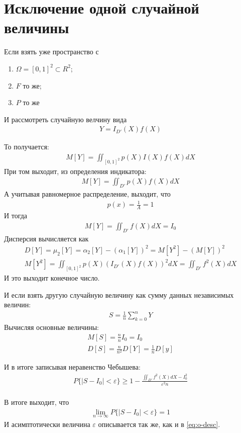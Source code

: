 \section{Исключение одной случайной величины}
Если взять уже пространство с
\begin{enumerate}
	\item \(\Omega = [0,1]^2 \subset R^2\);
	\item \(F\) то же;
	\item \(P\) то же
\end{enumerate}

И рассмотреть случайную велчину вида
\begin{align}
	Y = I_{D'}(X)f(X)
\end{align}

То получается:
\begin{align}
	M[Y] = \iint_{[0,1]^2} p(X) I(X) f(X) dX
\end{align}
При том выходит, из определения индикатора:
\begin{align}
	M[Y] = \iint_{D'} p(X)f(X) dX
\end{align}
А учитывая равномерное распределение, выходит, что
\begin{align}
	p(x) = \frac{1}{A} = 1
\end{align}
И тогда
\begin{align}
	M[Y] = \iint_{D'} f(X) dX = I_0
\end{align}
Дисперсия вычисляется как
\begin{align}
	D[Y] = \mu_2[Y] = \alpha_2[Y] - (\alpha_1[Y])^2 = M[Y^2] - (M[Y])^2 \\
	M[Y^2] = \iint_{[0, 1]^2} p(X)(I_{D'}(X)f(X))^2 dX = \iint_{D'}f^2(X) dX
\end{align}
И это выходит конечное число.

И если взять другую случайную величину как сумму данных независимых величин:
\begin{align}
	S = \frac{1}{n}\sum_{k=0}^n Y
\end{align}
Вычисляя основные величины:
\begin{align}
	M[S] = \frac{n}{n}I_0 = I_0 \\
	D[S] = \frac{n}{n^2} D[Y] = \frac{1}{n} D[y]
\end{align}

И в итоге записывая неравенство Чебышева:
\begin{align}
	P\{|S - I_0|<\varepsilon\} \geq 1 - \frac{\iint_{D'}f^2(X)dX - I_0^2}{\varepsilon^2 n} \\
\end{align}

В итоге выходит, что
\begin{align}
	\lim_{n\to\infty}P\{|S - I_0|<\varepsilon\} = 1
\end{align}
И асимптотически величина \(\varepsilon\) описывается так же, как и в \cref{eq:o-desc}.

